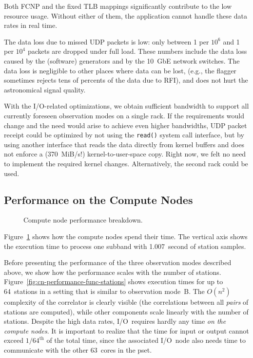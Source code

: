 \documentclass{sig-alternate}
\begin{document}
Both FCNP and the fixed TLB mappings significantly contribute to the low
resource usage.
Without either of them, the application cannot handle these data rates in
real time.

The data loss due to missed UDP packets is low: only between 1 per $10^6$ and
1 per $10^4$ packets are dropped under full load.
These numbers include the data loss caused by the (software) generators and by
the 10~GbE network switches.
The data loss is negligible to other places where data can be lost,
(e.g., the flagger sometimes rejects tens of percents of the data due to RFI),
and does not hurt the astronomical signal quality.

With the I/O-related optimizations, we obtain sufficient bandwidth to
support all currently foreseen observation modes on a single rack.
If the requirements would change and the need would arise to achieve even
higher bandwidths, UDP packet receipt could be optimized by not using the
\texttt{read()} system call interface,
but by using another interface that reads the data directly from kernel buffers
and does not enforce a (370~MiB/s!) kernel-to-user-space copy.
Right now, we felt no need to implement the required kernel changes.
Alternatively, the second rack could be used.


\subsection{Performance on the Compute Nodes}

\begin{figure}[ht]
\hfill
\caption{Compute node performance breakdown.}
\label{fig:cn-performance}
\end{figure}

Figure~\ref{fig:cn-performance} shows how the compute nodes spend their time.
The vertical axis shows the execution time to process one subband with
1.007~second of station samples.

Before presenting the performance of the three observation modes described
above, we show how the performance scales with the number of stations.
Figure~\ref{fig:cn-performance-func-stations} shows execution times for up to
64~stations in a setting that is similar to observation mode~\textsf{B}.
The $O(n^2)$ complexity of the correlator is clearly visible (the correlations
between all \emph{pairs\/} of stations are computed), while other
components scale linearly with the number of stations.
Despite the high data rates, I/O~requires hardly any time \emph{on the compute nodes}.
It is important to realize that the time for input or output cannot exceed
$1/64^\mathrm{th}$ of the total time, since the associated I/O~node also needs
time to communicate with the other 63~cores in the pset.
\end{document}
